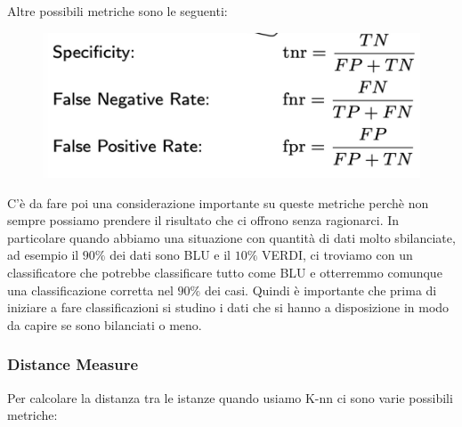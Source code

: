 \documentclass[14pt]{extreport}
\begin{document}
	Altre possibili metriche sono le seguenti:
	

	\begin{figure}[H] 
		\centering
		\includegraphics[width=0.7\linewidth]{462.jpeg}
		\end{figure}

		C’è da fare poi una considerazione importante su queste metriche perchè non sempre possiamo prendere il risultato che ci offrono senza ragionarci.
In particolare quando abbiamo una situazione con quantità di dati molto sbilanciate, ad esempio il $90\%$ dei dati sono BLU e il $10\%$ VERDI, ci troviamo con un classificatore che potrebbe classificare tutto come BLU e otterremmo comunque una classificazione corretta nel $90\%$ dei casi.
Quindi è importante che prima di iniziare a fare classificazioni si studino i dati che si hanno a disposizione in modo da capire se sono bilanciati o meno.

	
	\subsubsection{Distance Measure} 

	Per calcolare la distanza tra le istanze quando usiamo K-nn ci sono varie possibili metriche:
\end{document}

